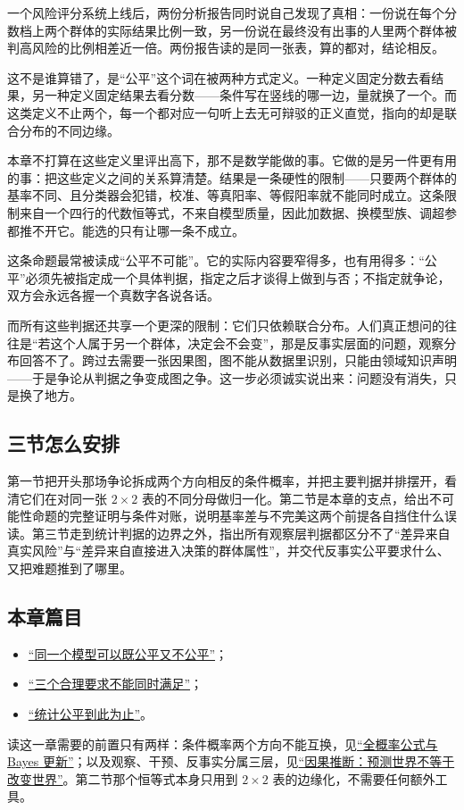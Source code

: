 一个风险评分系统上线后，两份分析报告同时说自己发现了真相：一份说在每个分数档上两个群体的实际结果比例一致，另一份说在最终没有出事的人里两个群体被判高风险的比例相差近一倍。两份报告读的是同一张表，算的都对，结论相反。

这不是谁算错了，是``公平''这个词在被两种方式定义。一种定义固定分数去看结果，另一种定义固定结果去看分数——条件写在竖线的哪一边，量就换了一个。而这类定义不止两个，每一个都对应一句听上去无可辩驳的正义直觉，指向的却是联合分布的不同边缘。

本章不打算在这些定义里评出高下，那不是数学能做的事。它做的是另一件更有用的事：把这些定义之间的关系算清楚。结果是一条硬性的限制——只要两个群体的基率不同、且分类器会犯错，校准、等真阳率、等假阳率就不能同时成立。这条限制来自一个四行的代数恒等式，不来自模型质量，因此加数据、换模型族、调超参都推不开它。能选的只有让哪一条不成立。

这条命题最常被读成``公平不可能''。它的实际内容要窄得多，也有用得多：``公平''必须先被指定成一个具体判据，指定之后才谈得上做到与否；不指定就争论，双方会永远各握一个真数字各说各话。

而所有这些判据还共享一个更深的限制：它们只依赖联合分布。人们真正想问的往往是``若这个人属于另一个群体，决定会不会变''，那是反事实层面的问题，观察分布回答不了。跨过去需要一张因果图，图不能从数据里识别，只能由领域知识声明——于是争论从判据之争变成图之争。这一步必须诚实说出来：问题没有消失，只是换了地方。

\subsection{三节怎么安排}

第一节把开头那场争论拆成两个方向相反的条件概率，并把主要判据并排摆开，看清它们在对同一张 \(2\times2\) 表的不同分母做归一化。第二节是本章的支点，给出不可能性命题的完整证明与条件对账，说明基率差与不完美这两个前提各自挡住什么误读。第三节走到统计判据的边界之外，指出所有观察层判据都区分不了``差异来自真实风险''与``差异来自直接进入决策的群体属性''，并交代反事实公平要求什么、又把难题推到了哪里。

\subsection{本章篇目}

\begin{itemize}
\tightlist
\item \hyperref[sec:17-Constrained-Guarantees/03-Fairness-Impossibility/01]{``同一个模型可以既公平又不公平''}；
\item \hyperref[sec:17-Constrained-Guarantees/03-Fairness-Impossibility/02]{``三个合理要求不能同时满足''}；
\item \hyperref[sec:17-Constrained-Guarantees/03-Fairness-Impossibility/03]{``统计公平到此为止''}。
\end{itemize}

读这一章需要的前置只有两样：条件概率两个方向不能互换，见\hyperref[sec:05-Probability/02-Conditional-Probability/02]{``全概率公式与 Bayes 更新''}；以及观察、干预、反事实分属三层，见\hyperref[ch:120]{``因果推断：预测世界不等于改变世界''}。第二节那个恒等式本身只用到 \(2\times2\) 表的边缘化，不需要任何额外工具。
